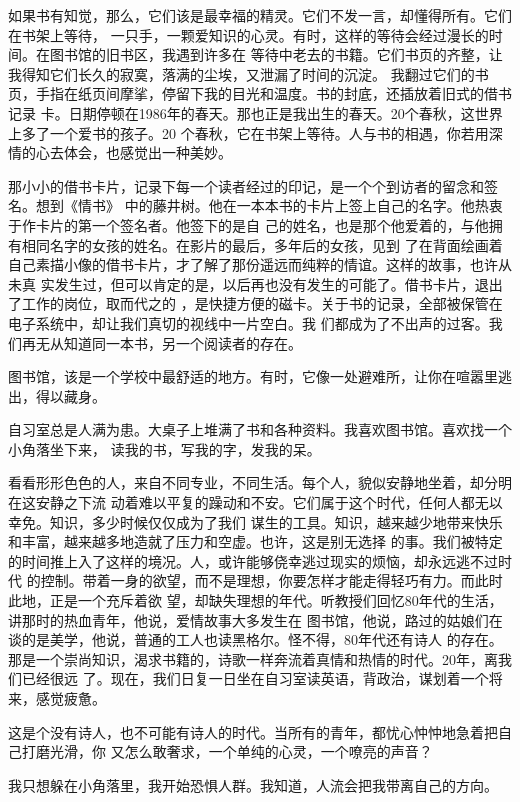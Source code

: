 \documentclass[12pt,a4paper]{article}
\begin{document}
		如果书有知觉，那么，它们该是最幸福的精灵。它们不发一言，却懂得所有。它们在书架上等待，
	一只手，一颗爱知识的心灵。有时，这样的等待会经过漫长的时间。在图书馆的旧书区，我遇到许多在
	等待中老去的书籍。它们书页的齐整，让我得知它们长久的寂寞，落满的尘埃，又泄漏了时间的沉淀。
	我翻过它们的书页，手指在纸页间摩挲，停留下我的目光和温度。书的封底，还插放着旧式的借书记录
	卡。日期停顿在1986年的春天。那也正是我出生的春天。20个春秋，这世界上多了一个爱书的孩子。20
	个春秋，它在书架上等待。人与书的相遇，你若用深情的心去体会，也感觉出一种美妙。

		那小小的借书卡片，记录下每一个读者经过的印记，是一个个到访者的留念和签名。想到《情书》
	中的藤井树。他在一本本书的卡片上签上自己的名字。他热衷于作卡片的第一个签名者。他签下的是自
	己的姓名，也是那个他爱着的，与他拥有相同名字的女孩的姓名。在影片的最后，多年后的女孩，见到
	了在背面绘画着自己素描小像的借书卡片，才了解了那份遥远而纯粹的情谊。这样的故事，也许从未真
	实发生过，但可以肯定的是，以后再也没有发生的可能了。借书卡片，退出了工作的岗位，取而代之的
	，是快捷方便的磁卡。关于书的记录，全部被保管在电子系统中，却让我们真切的视线中一片空白。我
	们都成为了不出声的过客。我们再无从知道同一本书，另一个阅读者的存在。

		图书馆，该是一个学校中最舒适的地方。有时，它像一处避难所，让你在喧嚣里逃出，得以藏身。

		自习室总是人满为患。大桌子上堆满了书和各种资料。我喜欢图书馆。喜欢找一个小角落坐下来，
	读我的书，写我的字，发我的呆。

		看看形形色色的人，来自不同专业，不同生活。每个人，貌似安静地坐着，却分明在这安静之下流
	动着难以平复的躁动和不安。它们属于这个时代，任何人都无以幸免。知识，多少时候仅仅成为了我们
	谋生的工具。知识，越来越少地带来快乐和丰富，越来越多地造就了压力和空虚。也许，这是别无选择
	的事。我们被特定的时间推上入了这样的境况。人，或许能够侥幸逃过现实的烦恼，却永远逃不过时代
	的控制。带着一身的欲望，而不是理想，你要怎样才能走得轻巧有力。而此时此地，正是一个充斥着欲
	望，却缺失理想的年代。听教授们回忆80年代的生活，讲那时的热血青年，他说，爱情故事大多发生在
	图书馆，他说，路过的姑娘们在谈的是美学，他说，普通的工人也读黑格尔。怪不得，80年代还有诗人
	的存在。那是一个崇尚知识，渴求书籍的，诗歌一样奔流着真情和热情的时代。20年，离我们已经很远
	了。现在，我们日复一日坐在自习室读英语，背政治，谋划着一个将来，感觉疲惫。

		这是个没有诗人，也不可能有诗人的时代。当所有的青年，都忧心忡忡地急着把自己打磨光滑，你
	又怎么敢奢求，一个单纯的心灵，一个嘹亮的声音？

		我只想躲在小角落里，我开始恐惧人群。我知道，人流会把我带离自己的方向。
\end{document}
